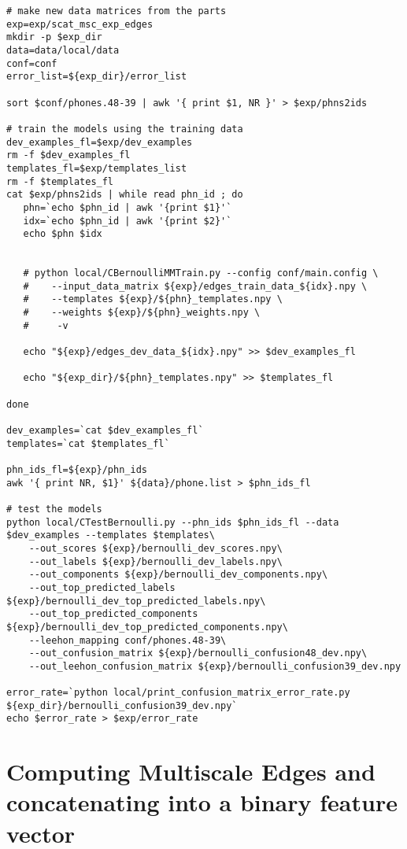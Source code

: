 \documentclass{article}
\begin{document}
\begin{verbatim}
# make new data matrices from the parts
exp=exp/scat_msc_exp_edges
mkdir -p $exp_dir
data=data/local/data
conf=conf
error_list=${exp_dir}/error_list

sort $conf/phones.48-39 | awk '{ print $1, NR }' > $exp/phns2ids

# train the models using the training data
dev_examples_fl=$exp/dev_examples
rm -f $dev_examples_fl
templates_fl=$exp/templates_list
rm -f $templates_fl
cat $exp/phns2ids | while read phn_id ; do
   phn=`echo $phn_id | awk '{print $1}'`
   idx=`echo $phn_id | awk '{print $2}'`
   echo $phn $idx


   # python local/CBernoulliMMTrain.py --config conf/main.config \
   #    --input_data_matrix ${exp}/edges_train_data_${idx}.npy \
   #    --templates ${exp}/${phn}_templates.npy \
   #    --weights ${exp}/${phn}_weights.npy \
   #     -v

   echo "${exp}/edges_dev_data_${idx}.npy" >> $dev_examples_fl

   echo "${exp_dir}/${phn}_templates.npy" >> $templates_fl

done

dev_examples=`cat $dev_examples_fl`
templates=`cat $templates_fl`

phn_ids_fl=${exp}/phn_ids
awk '{ print NR, $1}' ${data}/phone.list > $phn_ids_fl

# test the models
python local/CTestBernoulli.py --phn_ids $phn_ids_fl --data $dev_examples --templates $templates\
    --out_scores ${exp}/bernoulli_dev_scores.npy\
    --out_labels ${exp}/bernoulli_dev_labels.npy\
    --out_components ${exp}/bernoulli_dev_components.npy\
    --out_top_predicted_labels ${exp}/bernoulli_dev_top_predicted_labels.npy\
    --out_top_predicted_components ${exp}/bernoulli_dev_top_predicted_components.npy\
    --leehon_mapping conf/phones.48-39\
    --out_confusion_matrix ${exp}/bernoulli_confusion48_dev.npy\
    --out_leehon_confusion_matrix ${exp}/bernoulli_confusion39_dev.npy

error_rate=`python local/print_confusion_matrix_error_rate.py ${exp_dir}/bernoulli_confusion39_dev.npy`
echo $error_rate > $exp/error_rate

\end{verbatim}

\section{Computing Multiscale Edges and concatenating into a binary feature vector}
\end{document}
